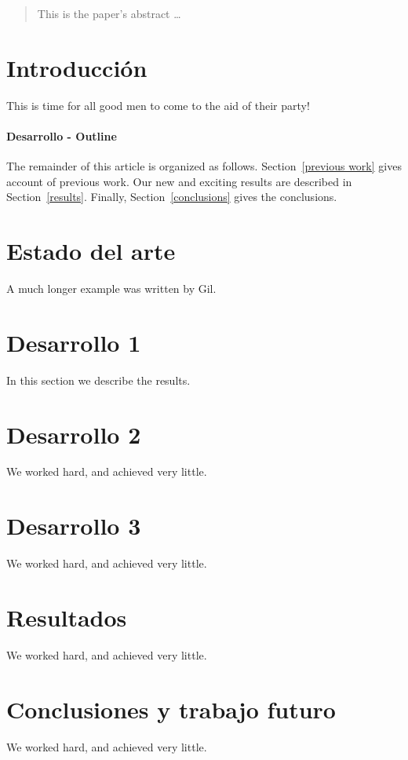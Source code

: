 \documentclass[12pt]{article}
\begin{document}
\maketitle

\begin{abstract}
This is the paper's abstract \ldots
\end{abstract}

\section{Introducción}
This is time for all good men to come to the aid of their party!

\paragraph{Desarrollo - Outline}
The remainder of this article is organized as follows.
Section~\ref{previous work} gives account of previous work.
Our new and exciting results are described in Section~\ref{results}.
Finally, Section~\ref{conclusions} gives the conclusions.

\section{Estado del arte}\label{Estado}
A much longer \LaTeXe{} example was written by Gil.

\section{Desarrollo 1}\label{d1}
In this section we describe the results.

\section{Desarrollo 2}\label{d2}
We worked hard, and achieved very little.

\section{Desarrollo 3}\label{d3}
We worked hard, and achieved very little.

\section{Resultados}\label{res}
We worked hard, and achieved very little.

\section{Conclusiones y trabajo futuro}\label{conc}
We worked hard, and achieved very little.



\end{document}
